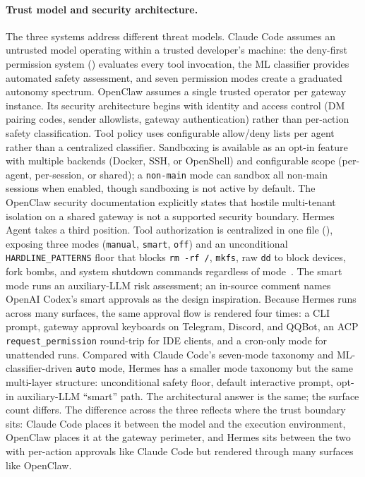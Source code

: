 \paragraph{Trust model and security architecture.}
The three systems address different threat models. Claude Code assumes an untrusted model operating within a trusted developer's machine: the deny-first permission system () evaluates every tool invocation, the ML classifier provides automated safety assessment, and seven permission modes create a graduated autonomy spectrum. OpenClaw assumes a single trusted operator per gateway instance. Its security architecture begins with identity and access control (DM pairing codes, sender allowlists, gateway authentication) rather than per-action safety classification. Tool policy uses configurable allow/deny lists per agent rather than a centralized classifier. Sandboxing is available as an opt-in feature with multiple backends (Docker, SSH, or OpenShell) and configurable scope (per-agent, per-session, or shared); a \texttt{non-main} mode can sandbox all non-main sessions when enabled, though sandboxing is not active by default. The OpenClaw security documentation explicitly states that hostile multi-tenant isolation on a shared gateway is not a supported security boundary. Hermes Agent takes a third position. Tool authorization is centralized in one file (), exposing three modes (\texttt{manual}, \texttt{smart}, \texttt{off}) and an unconditional \texttt{HARDLINE\_PATTERNS} floor that blocks \texttt{rm -rf /}, \texttt{mkfs}, raw \texttt{dd} to block devices, fork bombs, and system shutdown commands regardless of mode~\tierB{}. The smart mode runs an auxiliary-LLM risk assessment; an in-source comment names OpenAI Codex's smart approvals as the design inspiration. Because Hermes runs across many surfaces, the same approval flow is rendered four times: a CLI prompt, gateway approval keyboards on Telegram, Discord, and QQBot, an ACP \texttt{request\_permission} round-trip for IDE clients, and a cron-only mode for unattended runs. Compared with Claude Code's seven-mode taxonomy and ML-classifier-driven \texttt{auto} mode, Hermes has a smaller mode taxonomy but the same multi-layer structure: unconditional safety floor, default interactive prompt, opt-in auxiliary-LLM ``smart'' path. The architectural answer is the same; the surface count differs. The difference across the three reflects where the trust boundary sits: Claude Code places it between the model and the execution environment, OpenClaw places it at the gateway perimeter, and Hermes sits between the two with per-action approvals like Claude Code but rendered through many surfaces like OpenClaw.

